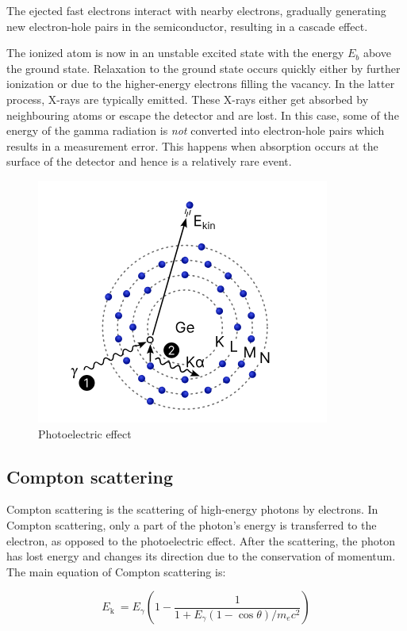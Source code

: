 \documentclass{article}
\begin{document}
The ejected fast electrons interact with nearby electrons, gradually generating new electron-hole pairs in the semiconductor, resulting in a cascade effect.

The ionized atom is now in an unstable excited state with the energy $E_b$ above the ground state. Relaxation to the ground state occurs quickly either by further ionization or due to the higher-energy electrons filling the vacancy. In the latter process, X-rays are typically emitted. These X-rays either get absorbed by neighbouring atoms or escape the detector and are lost. In this case, some of the energy of the gamma radiation is \textit{not} converted into electron-hole pairs which results in a measurement error. This happens when absorption occurs at the surface of the detector and hence is a relatively rare event. 
\begin{figure}[h]
    \centering
    \includegraphics[width=0.5\linewidth]{Figures/Intro/2.png}
    \caption{Photoelectric effect \cite{plotzki_2024_highresolution}}
    \label{fig:Photoelectric effect}
\end{figure}

\pagebreak{}

\subsection{Compton scattering}
Compton scattering is the scattering of high-energy photons by electrons. In Compton scattering, only a part of the photon's energy is transferred to the electron, as opposed to the photoelectric effect. After the scattering, the photon has lost energy and changes its direction due to the conservation of momentum. The main equation of Compton scattering is: 

\begin{equation}
    E_{\text {k }}=E_\gamma\left(1-\frac{1}{1+E_\gamma(1-\cos \theta) / m_{e} c^2}\right)
	\label{eq:Compton}
\end{equation}
\end{document}
